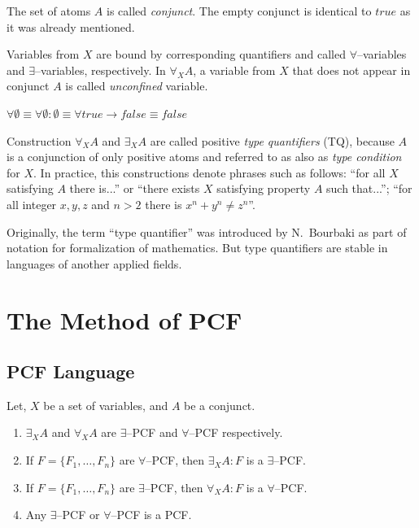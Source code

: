 \documentclass[runningheads,a4paper]{llncs}
\begin{document}
The set of atoms $A$ is called {\em conjunct}. The empty conjunct is identical to $true$ as it was already mentioned.

Variables from $X$ are bound by corresponding quantifiers and called $\forall$--variables and $\exists$--variables, respectively. In $\forall_XA$, a variable from $X$ that does not appear in conjunct $A$ is called {\em unconfined} variable.

$\forall \emptyset \equiv \forall \emptyset\colon\emptyset \equiv \forall true \rightarrow false \equiv false$

Construction $\forall_XA$ and $\exists_XA$ are called positive \emph{type quantifiers} (TQ), because $A$ is a conjunction of only positive atoms and referred to as also as \emph{type condition} for $X$. In practice, this constructions denote phrases such as follows: ``for all $X$ satisfying $A$ there is...'' or ``there exists $X$ satisfying property $A$ such that...''; ``for all integer $x,y,z$ and $n>2$ there is $x^n + y^n \ne z^n$''.

Originally, the term ``type quantifier'' was introduced by N.~Bourbaki \cite{Bourbaki} as part of notation for formalization of mathematics. But type quantifiers are stable in languages of another applied fields.

\section{The Method of PCF}

\subsection{PCF Language}

\begin{definition}
\label{def:pcf}
Let, $X$ be a set of variables, and $A$ be a conjunct.
\begin{enumerate}

\item $\exists_XA$ and $\forall_XA$ are $\exists$--PCF and $\forall$--PCF respectively.

\item If $F = \{F_1,\ldots,F_n\}$ are $\forall$--PCF, then $\exists_XA\colon F$ is a $\exists$--PCF.

\item If $F = \{F_1,\ldots,F_n\}$ are $\exists$--PCF, then $\forall_XA\colon F$ is a $\forall$--PCF.

\item Any $\exists$--PCF or $\forall$--PCF is a PCF.
\end{enumerate}
\end{definition}
\end{document}
